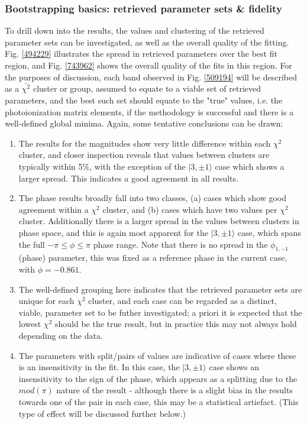 \subsubsection{Bootstrapping basics: retrieved parameter sets \& fidelity}

To drill down into the results, the values and clustering of the retrieved parameter sets can be investigated, as well as the overall quality of the fitting. Fig. \ref{494229} illustrates the spread in retrieved parameters over the best fit region, and Fig. \ref{743962} shows the overall quality of the fits in this region. For the purposes of discussion, each band observed in Fig. \ref{509194} will be described as a $\bar{\chi^2}$ cluster or group, assumed to equate to a viable set of retrieved parameters, and the best such set should equate to the "true" values, i.e. the photoionization matrix elements, if the methodology is successful and there is a well-defined global minima. Again, some tentative conclusions can be drawn:

\begin{enumerate}
\item The results for the magnitudes show very little difference within each $\chi^2$ cluster, and closer inspection reveals that values between clusters are typically within 5\%, with the exception of the $|3,\pm1\rangle$ case which shows a larger spread. This indicates a good agreement in all results.
\item The phase results broadly fall into two classes, (a) cases which show good agreement within a $\chi^2$ cluster, and (b) cases which have two values per $\chi^2$ cluster. Additionally there is a larger spread in the values between clusters in phase space, and this is again most apparent for the $|3,\pm1\rangle$ case, which spans the full $-\pi\leq\phi\leq\pi$ phase range. Note that there is no spread in the $\phi_{1,-1}$ (phase) parameter, this was fixed as a reference phase in the current case, with $\phi=-0.861$.
\item The well-defined grouping here indicates that the retrieved parameter sets are unique for each $\chi^2$ cluster, and each case can be regarded as a distinct, viable, parameter set to be futher investigated; a priori it is expected that the lowest $\chi^2$ should be the true result, but in practice this may not always hold depending on the data.
\item The parameters with split/pairs of values are indicative of cases where these is an insensitivity in the fit. In this case, the $|3,\pm1\rangle$ case shows an insensitivity to the sign of the phase, which appears as a splitting due to the $mod(\pi)$ nature of the result - although there is a slight bias in the results towards one of the pair in each case, this may be a statistical artiefact. (This type of effect will be discussed further below.)
\end{enumerate}


